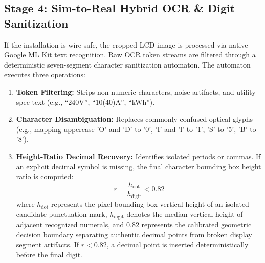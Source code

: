 \documentclass[12pt,a4paper,oneside]{report}
\begin{document}
\subsection{Stage 4: Sim-to-Real Hybrid OCR \& Digit Sanitization}
If the installation is wire-safe, the cropped LCD image is processed via native Google ML Kit text recognition. Raw OCR token streams are filtered through a deterministic seven-segment character sanitization automaton. The automaton executes three operations:
\begin{enumerate}
    \item \textbf{Token Filtering:} Strips non-numeric characters, noise artifacts, and utility spec text (e.g., ``240V'', ``10(40)A'', ``kWh'').
    \item \textbf{Character Disambiguation:} Replaces commonly confused optical glyphs (e.g., mapping uppercase 'O' and 'D' to '0', 'I' and 'l' to '1', 'S' to '5', 'B' to '8').
    \item \textbf{Height-Ratio Decimal Recovery:} Identifies isolated periods or commas. If an explicit decimal symbol is missing, the final character bounding box height ratio is computed:
    \begin{equation}
    r = \frac{h_{\text{dot}}}{h_{\text{digit}}} < 0.82
    \end{equation}
    where $h_{\text{dot}}$ represents the pixel bounding-box vertical height of an isolated candidate punctuation mark, $h_{\text{digit}}$ denotes the median vertical height of adjacent recognized numerals, and $0.82$ represents the calibrated geometric decision boundary separating authentic decimal points from broken display segment artifacts. If $r < 0.82$, a decimal point is inserted deterministically before the final digit.
\end{enumerate}
\end{document}
